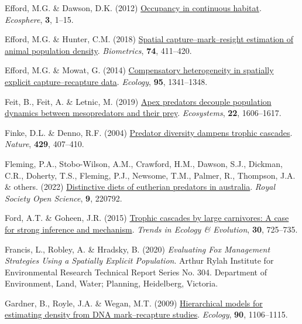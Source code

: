 \documentclass[preprint, 3p, authoryear]{elsarticle} %
\newlength{\cslhangindent}
\newlength{\cslentryspacingunit} %
\newenvironment{CSLReferences}[2] %
 {%
  \setlength{\parindent}{0pt}
  \ifodd #1
  \let\oldpar\par
  \def\par{\hangindent=\cslhangindent\oldpar}
  \fi
  \setlength{\parskip}{#2\cslentryspacingunit}
 }%
 {}
\begin{document}
\begin{CSLReferences}{1}{0}
\leavevmode{}%
Efford, M.G. \& Dawson, D.K. (2012) \href{https://doi.org/10.1890/ES11-00308.1}{Occupancy in continuous habitat}. \emph{Ecosphere}, \textbf{3}, 1--15.

\leavevmode{}%
Efford, M.G. \& Hunter, C.M. (2018) \href{https://doi.org/10.1111/biom.12766}{Spatial capture--mark--resight estimation of animal population density}. \emph{Biometrics}, \textbf{74}, 411--420.

\leavevmode{}%
Efford, M.G. \& Mowat, G. (2014) \href{https://doi.org/10.1890/13-1497.1}{Compensatory heterogeneity in spatially explicit capture--recapture data}. \emph{Ecology}, \textbf{95}, 1341--1348.

\leavevmode{}%
Feit, B., Feit, A. \& Letnic, M. (2019) \href{https://doi.org/10.1007/s10021-019-00360-2}{Apex predators decouple population dynamics between mesopredators and their prey}. \emph{Ecosystems}, \textbf{22}, 1606--1617.

\leavevmode{}%
Finke, D.L. \& Denno, R.F. (2004) \href{https://doi.org/10.1038/nature02554}{Predator diversity dampens trophic cascades}. \emph{Nature}, \textbf{429}, 407--410.

\leavevmode{}%
Fleming, P.A., Stobo-Wilson, A.M., Crawford, H.M., Dawson, S.J., Dickman, C.R., Doherty, T.S., Fleming, P.J., Newsome, T.M., Palmer, R., Thompson, J.A. \& others. (2022) \href{https://doi.org/10.1098/rsos.220792}{Distinctive diets of eutherian predators in australia}. \emph{Royal Society Open Science}, \textbf{9}, 220792.

\leavevmode{}%
Ford, A.T. \& Goheen, J.R. (2015) \href{https://doi.org/10.1016/j.tree.2015.09.012}{Trophic cascades by large carnivores: A case for strong inference and mechanism}. \emph{Trends in Ecology \& Evolution}, \textbf{30}, 725--735.

\leavevmode{}%
Francis, L., Robley, A. \& Hradsky, B. (2020) \emph{Evaluating Fox Management Strategies Using a Spatially Explicit Population}. Arthur Rylah Institute for Environmental Research Technical Report Series No. 304. Department of Environment, Land, Water; Planning, Heidelberg, Victoria.

\leavevmode{}%
Gardner, B., Royle, J.A. \& Wegan, M.T. (2009) \href{https://doi.org/10.1890/07-2112.1}{Hierarchical models for estimating density from DNA mark--recapture studies}. \emph{Ecology}, \textbf{90}, 1106--1115.


\end{CSLReferences}
\end{document}
